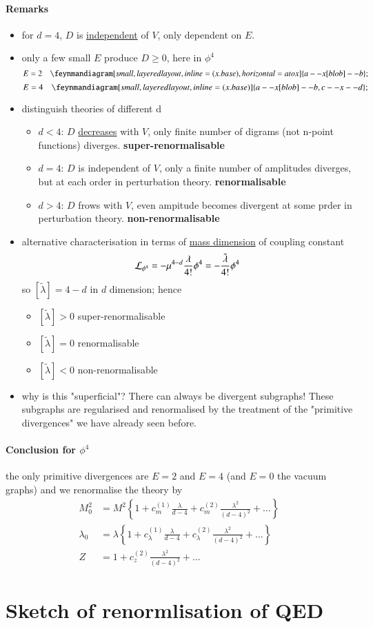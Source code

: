\paragraph{Remarks}
\begin{itemize}
	\item for $d=4$, $D$ is \underline{independent} of $V$, only dependent on $E$.
	\item only a few small $E$ produce $D \geq 0$, here in $\phi^4$
		$$E = 2 \quad \feynmandiagram[small, layered layout, inline=(x.base),horizontal=a to x]{a -- x[blob] -- b};$$
		$$E = 4 \quad \feynmandiagram[small, layered layout, inline=(x.base)]{a -- x[blob] -- b, c -- x -- d};$$
	\item distinguish theories of different d
		\begin{itemize}
			\item $d < 4$: $D$ \underline{decreases} with $V$, only finite number of digrams (not n-point functions) diverges.
				\textbf{super-renormalisable}
			\item $d=4$: $D$ is independent of $V$, only a finite number of amplitudes diverges, but at each order in perturbation theory.
				\textbf{renormalisable}
			\item $d>4$: $D$ frows with $V$, even ampitude becomes divergent at some prder in perturbation theory.
				\textbf{non-renormalisable}
		\end{itemize}
	\item alternative characterisation in terms of \underline{mass dimension} of coupling constant
		\begin{align*}
			\mathcal{L}_{\phi^4} = -\mu^{4-d}\frac{\lambda}{4!} \phi^4 = - \frac{\tilde{\lambda}}{4!} \phi^4
		\end{align*}
		so $[\tilde{\lambda}] = 4-d$ in $d$ dimension; hence 
			\begin{itemize}
				\item $[\tilde{\lambda}] > 0$ super-renormalisable
				\item $[\tilde{\lambda}] = 0$ renormalisable
				\item $[\tilde{\lambda}] < 0$ non-renormalisable
			\end{itemize}
		\item why is this "superficial"? There can always be divergent subgraphs! These subgraphs are regularised and renormalised by the treatment of the "primitive divergences" we have already seen before.
\end{itemize}
\paragraph{Conclusion for $\phi^4$}
the only primitive divergences are $E=2$ and $E=4$ (and $E=0$ the vacuum graphs) and we renormalise the theory by  
\begin{align*}
	M_0^2 &= M^2 \left\{ 1 + c_m^{(1)}\frac{\lambda}{d-4} + c_m^{(2)}\frac{\lambda^2}{(d-4)^2} + \dots \right\} \\
	\lambda_0 &= \lambda \left\{ 1 + c_\lambda^{(1)}\frac{\lambda}{d-4} + c_\lambda^{(2)}\frac{\lambda^2}{(d-4)^2} + \dots \right\} \\
	Z &= 1 + c_z^{(2)} \frac{\lambda^2}{(d-4)^2} + \dots
\end{align*}

\section{Sketch of renormlisation of QED}
